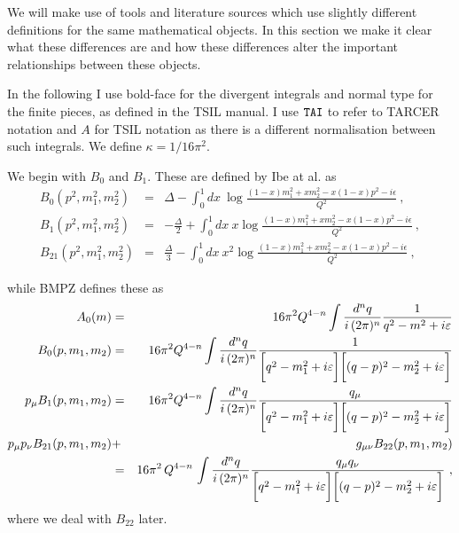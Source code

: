 \documentclass[11pt]{article}
\begin{document}
We will make use of tools and literature sources which use slightly different definitions for the same mathematical objects.  In this section we make it clear what these differences are and how these differences alter the important relationships between these objects.


In the following I use bold-face for the divergent integrals and normal type for the finite pieces, as defined in the TSIL manual.  I use $\tt{TAI}$ to refer to TARCER notation and $A$ for TSIL notation as there is a different normalisation between such integrals.  We define $\kappa = 1/16\pi^2$.

We begin with $B_0$ and $B_1$.  These are defined by Ibe at al. as
\begin{eqnarray}
B_0(p^2, m_1^2, m_2^2) &=& \Delta
- \int_0^1 dx ~\log \frac{ (1-x)m_1^2 + x m_2^2 - x(1-x)p^2 -i\epsilon }{Q^2}\ , \\
B_1(p^2, m_1^2, m_2^2) &=& -\frac{\Delta}{2}
+ \int_0^1 dx ~x\log \frac{ (1-x)m_1^2 + x m_2^2 - x(1-x)p^2 -i\epsilon }{Q^2}\ , \\
B_{21}(p^2, m_1^2, m_2^2) &=& \frac{\Delta}{3}
- \int_0^1 dx ~x^2\log \frac{ (1-x)m_1^2 + x m_2^2 - x(1-x)p^2 -i\epsilon }{Q^2}\ ,
\end{eqnarray}

while BMPZ defines these as
\begin{eqnarray}
A_0(m) &=& 16\pi^2Q^{4-n}\int{d^nq\over i\,(2\pi)^n}{1\over
q^2-m^2+i\varepsilon}\\
B_0(p, m_1, m_2) &=&
16\pi^2Q^{4-n}\int{d^nq\over i\,(2\pi)^n}
{1\over\biggl[q^2-m^2_1+i\varepsilon\biggr]\biggl[
(q-p)^2-m_2^2+i\varepsilon\biggr]}
\label{B0 def}  \\
p_\mu B_1(p, m_1,m_2) &=& 16\pi^2Q^{4-n}\int
{d^nq\over i\,(2\pi)^n}{q_\mu\over\biggl[q^2-m^2_1+i\varepsilon\biggr]
\biggl[(q-p)^2-m_2^2+i\varepsilon\biggr]}\label{B1 def} \\ p_\mu p_\nu
B_{21}(p,m_1,m_2) &+& g_{\mu\nu}B_{22}(p,m_1,m_2)
\label{B22 def}\\
 &=& 16\pi^2\,Q^{4-n}\,\int{d^nq\over i\,(2\pi)^n} {q_\mu
q_\nu\over\biggl[q^2-m^2_1+i\varepsilon\biggr]\biggl[
(q-p)^2-m_2^2+i\varepsilon\biggr]}\ , \nonumber
\end{eqnarray}
where we deal with $B_{22}$ later.  
\end{document}
